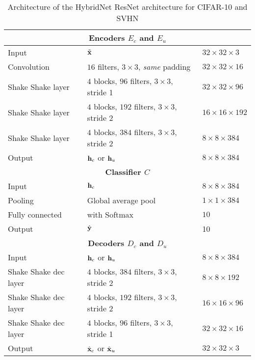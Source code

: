 \documentclass[runningheads]{llncs}
\begin{document}
 \begin{table}[htbp]
\centering
\caption{Architecture of the HybridNet ResNet architecture for CIFAR-10 and SVHN}
\label{tab:resnet}
\begin{threeparttable}
\setlength{\tabcolsep}{4pt}
\begin{tabular}{ l l l}
\toprule
\multicolumn{3}{c}{\textbf{Encoders $E_c$ and $E_u$}} \\
\midrule
Input & $\tilde{\mathbf{x}}$ & $32\times 32\times 3$ \\
Convolution & $16$ filters, $3\times3$, \textit{same} padding & $32\times 32\times 16$ \\

Shake Shake layer & $4$ blocks, $96$ filters, $3\times3$,  stride 1 & $32\times 32\times 96$ \\
Shake Shake layer & $4$ blocks, $192$ filters, $3\times3$,  stride 2 & $16\times 16\times 192$ \\
Shake Shake layer & $4$ blocks, $384$ filters, $3\times3$,  stride 2 & $8\times 8\times 384$ \\
Output & $\mathbf{h}_c$ or $\mathbf{h}_u$ & $8\times 8\times 384$ \\

\toprule
\multicolumn{3}{c}{\textbf{Classifier $C$}}\\
\midrule
Input & $\mathbf{h}_c$& $8\times 8\times 384$ \\
Pooling & Global average pool & $1\times 1\times 384$ \\
Fully connected & with Softmax & $10$ \\
Output & $\hat{\mathbf{y}}$ & 10 \\
\toprule
\multicolumn{3}{c}{\textbf{Decoders $D_c$ and $D_u$}}\\
\midrule
Input & $\mathbf{h}_c$ or $\mathbf{h}_u$ & $8\times 8\times 384$ \\
Shake Shake dec layer & $4$ blocks, $384$ filters, $3\times3$,  stride 2 & $8\times 8\times 192$ \\
Shake Shake dec layer & $4$ blocks, $192$ filters, $3\times3$,  stride 2 & $16\times 16\times 96$ \\
Shake Shake dec layer & $4$ blocks, $96$ filters, $3\times3$,  stride 1 & $32\times 32\times 16$ \\
Output & $\hat{\mathbf{x}}_c$ or $\hat{\mathbf{x}}_u$ & $32\times 32 \times 3$ \\
\bottomrule
\end{tabular}
\begin{tablenotes}
\end{tablenotes}
\end{threeparttable}
\end{table}
\end{document}
